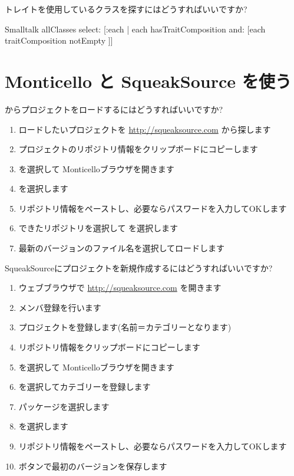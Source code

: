 \documentclass[a4paper,10pt,twoside]{book}
\begin{document}
\begin{faq}
トレイトを使用しているクラスを探すにはどうすればいいですか?
\end{faq}
\answer
\begin{code}{}
Smalltalk allClasses select: [:each | each hasTraitComposition and: [each traitComposition notEmpty ]]
\end{code}

\section{Monticello と SqueakSource を使う}

\begin{faq}
 からプロジェクトをロードするにはどうすればいいですか?
\end{faq}
\answer
\begin{enumerate}
  \item ロードしたいプロジェクトを \url{http://squeaksource.com} から探します
  \item プロジェクトのリポジトリ情報をクリップボードにコピーします
  \item {} を選択して Monticelloブラウザを開きます
  \item {} を選択します
  \item リポジトリ情報をペーストし、必要ならパスワードを入力してOKします
  \item できたリポジトリを選択して  を選択します
  \item 最新のバージョンのファイル名を選択してロードします
\end{enumerate}

\begin{faq}
SqueakSourceにプロジェクトを新規作成するにはどうすればいいですか?
\end{faq}
\answer
\begin{enumerate}
  \item ウェブブラウザで \url{http://squeaksource.com} を開きます
  \item メンバ登録を行います
  \item プロジェクトを登録します(名前＝カテゴリーとなります)
  \item リポジトリ情報をクリップボードにコピーします
  \item {} を選択して Monticelloブラウザを開きます
  \item {} を選択してカテゴリーを登録します
  \item パッケージを選択します
  \item {} を選択します
  \item リポジトリ情報をペーストし、必要ならパスワードを入力してOKします
  \item {}ボタンで最初のバージョンを保存します
\end{enumerate}
\end{document}
